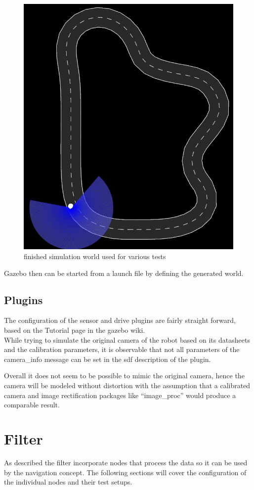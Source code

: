 \begin{figure}
	\centering
	\includegraphics[width=.5\textwidth]{Pictures/test track}
	\caption{finished simulation world used for various tests}
	\label{simworld}
\end{figure}

Gazebo then can be started from a launch file by defining the generated world.\\

\subsection{Plugins}
The configuration of the sensor and drive plugins are fairly straight forward, based on the Tutorial page in the gazebo wiki\cite{gazebotutorial}.\\



While trying to simulate the original camera of the robot based on its datasheets and the calibration parameters, it is observable that not all parameters of the camera\_info message can be set in the sdf description of the plugin.

Overall it does not seem to be possible to mimic the original camera, hence the camera will be modeled without distortion with the assumption that a calibrated camera and image rectification packages like ``image\_proc'' would produce a comparable result.



\section{Filter}

As described the filter incorporate nodes that process the data so it can be used by the navigation concept. The following sections will cover the configuration of the individual nodes and their test setups.

